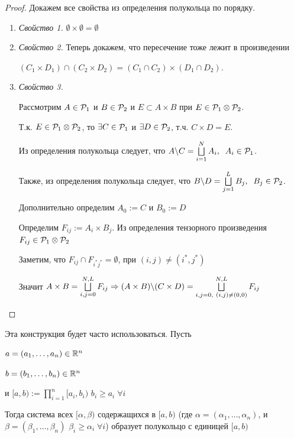\begin{proof} Докажем все свойства из определения полукольца по порядку.

\begin{enumerate}
\item \textit{Свойство 1.} $\emptyset \times \emptyset = \emptyset$

\item \textit{Свойство 2.} Теперь докажем, что пересечение тоже лежит в произведении

$(C_1 \times D_1) \cap (C_2 \times D_2) = (C_1 \cap C_2) \times (D_1 \cap D_2)$.

\item \textit{Свойство 3.}

Рассмотрим $A \in \mathcal{P}_1$ и $B \in \mathcal{P}_2$ и $E \subset A \times B$ при $E \in \mathcal{P}_1 \otimes \mathcal{P}_2$.

Т.к. $E \in \mathcal{P}_1 \otimes \mathcal{P}_2$, то $\exists C \in \mathcal{P}_1$ и $\exists D \in \mathcal{P}_2$, т.ч. $C \times D = E$.

Из определения полукольца следует, что $A \backslash C = \bigsqcup\limits_{i = 1}^{N} A_i, \;\; A_i \in \mathcal{P}_1$.

Также, из определения полукольца следует, что $B \backslash D = \bigsqcup\limits_{j = 1}^{L} B_j, \;\; B_j \in \mathcal{P}_2$.

Дополнительно определим $A_0 := C$ и $B_0 := D$

Определим $F_{ij} := A_i \times B_j$. Из определения тензорного произведения $F_{ij} \in \mathcal{P}_1 \otimes \mathcal{P}_2$

Заметим, что $F_{ij} \cap F_{i^*j^*} = \emptyset$, при $(i, j) \neq (i^*, j^*)$ 

Значит $A \times B = \bigsqcup\limits_{i, j = 0}^{N, L} F_{ij} \Rightarrow (A \times B) \backslash (C \times D) = \bigsqcup\limits_{i, j = 0, \ (i, j) \neq (0, 0)}^{N, L} F_{ij}$ 
\end{enumerate}
\end{proof}

\corollary Эта конструкция будет часто использоваться. Пусть

$a = (a_1, \dots, a_n) \in \mathbb{R}^n$

$b = (b_1, \dots, b_n) \in \mathbb{R}^n$

и $[a, b) := \prod\limits_{i= 1}^{n}[a_i, b_i)$ $b_i \geq a_i \; \forall i$

Тогда система всех $[\alpha, \beta)$ содержащихся в $[a, b)$ (где $\alpha = (\alpha_1, \dots, \alpha_n)$, и $\beta = (\beta_1, \dots, \beta_n)$ $\beta_i \geq \alpha_i \; \forall i$) образует полукольцо с единицей $[a, b)$

